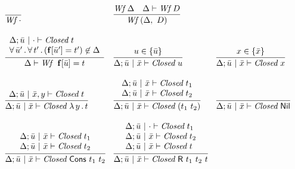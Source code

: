 \documentclass{article}
\begin{document}
\begin{figure}
  \[
  \begin{array}{lll}
    \infer{\textit{Wf}\ \cdot}{\ } &
    \infer{\textit{Wf}\ (\Delta,\ D)}{\textit{Wf}\ \Delta & \Delta \vdash \textit{Wf}\ D}
    &\
    \\ \\
    \infer{\Delta\vdash\textit{Wf}\ \ \mathbf{f}[\bar{u}] = t}
          {\begin{array}{l}
              \Delta; \bar{u}\ |\ \cdot \vdash\textit{Closed}\ t\\
          \all{\bar{u}'}{\all{t'}{(\mathbf{f}[\bar{u}'] = t')\not\in \Delta}} \end{array}} &
    \infer{\Delta; \bar{u}\ |\ \bar{x} \vdash\textit{Closed}\ u }{u \in \{\bar{u}\}} &
    \infer{\Delta; \bar{u}\ |\ \bar{x} \vdash\textit{Closed}\ x }{x \in \{\bar{x}\}} 
  \\ \\           
  \infer{\Delta;\bar{u}\ |\ \bar{x} \vdash\textit{Closed}\ \lam{y}{t}}{\Delta;\bar{u}\ |\ \bar{x},y \vdash\textit{Closed}\ t} &
  \infer{\Delta;\bar{u}\ |\ \bar{x} \vdash\textit{Closed}\ (t_1\ t_2)}{\begin{array}{l}\Delta;\bar{u}\ |\ \bar{x} \vdash\textit{Closed}\ t_1\\
                                                                                       \Delta;\bar{u}\ |\ \bar{x} \vdash\textit{Closed}\ t_2
                                                                       \end{array}} &
  \infer{\Delta;\bar{u}\ |\ \bar{x} \vdash\textit{Closed}\ \mathsf{Nil}}{\ }
  \\ \\
  \infer{\Delta;\bar{u}\ |\ \bar{x} \vdash\textit{Closed}\ \mathsf{Cons}\ t_1\ t_2}
         {\begin{array}{l}\Delta;\bar{u}\ |\ \bar{x} \vdash\textit{Closed}\ t_1\\
                          \Delta;\bar{u}\ |\ \bar{x} \vdash\textit{Closed}\ t_2
         \end{array}} &
  \infer{\Delta;\bar{u}\ |\ \bar{x} \vdash \textit{Closed}\ \mathsf{R}\ t_1\ t_2\ t}
        {\begin{array}{l}
         \Delta;\bar{u}\ |\ \cdot \vdash\textit{Closed}\ t_1\\
         \Delta;\bar{u}\ |\ \bar{x} \vdash\textit{Closed}\ t_2\\
         \Delta;\bar{u}\ |\ \bar{x} \vdash\textit{Closed}\ t
         \end{array}}

\end{array}\]
\end{figure}
\end{document}
